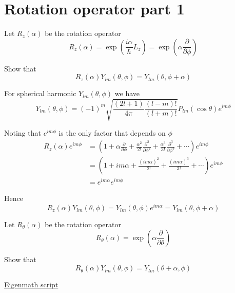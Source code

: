 

\section*{Rotation operator part 1}

Let $R_z(\alpha)$ be the rotation operator
\begin{equation*}
R_z(\alpha)=\exp\left(\frac{i\alpha}{\hbar}L_z\right)
=\exp\left(\alpha\frac{\partial}{\partial\phi}\right)
\end{equation*}

Show that
\begin{equation*}
R_z(\alpha)Y_{lm}(\theta,\phi)=Y_{lm}(\theta,\phi+\alpha)
\end{equation*}

For spherical harmonic $Y_{lm}(\theta,\phi)$ we have
\begin{equation*}
Y_{lm}(\theta,\phi)=(-1)^m\sqrt{\frac{(2l+1)}{4\pi}\frac{(l-m)!}{(l+m)!}}
P_{lm}(\cos\theta)e^{im\phi}
\end{equation*}

Noting that $e^{im\phi}$ is the only factor that depends on $\phi$
\begin{align*}
R_z(\alpha)e^{im\phi}
&=\left(1+\alpha\frac{\partial}{\partial\phi}
+\frac{\alpha^2}{2!}\frac{\partial^2}{\partial\phi^2}
+\frac{\alpha^3}{3!}\frac{\partial^3}{\partial\phi^3}
+\cdots\right)e^{im\phi}
\\
&=\left(1+im\alpha
+\frac{(im\alpha)^2}{2!}
+\frac{(im\alpha)^3}{3!}
+\cdots\right)e^{im\phi}
\\
&=e^{im\alpha}e^{im\phi}
\end{align*}

Hence
\begin{equation*}
R_z(\alpha)Y_{lm}(\theta,\phi)=Y_{lm}(\theta,\phi)e^{im\alpha}=Y_{lm}(\theta,\phi+\alpha)
\tag{1}
\end{equation*}

Let $R_\theta(\alpha)$ be the rotation operator
\begin{equation*}
R_\theta(\alpha)=\exp\left(\alpha\frac{\partial}{\partial\theta}\right)
\end{equation*}

Show that
\begin{equation*}
R_\theta(\alpha)Y_{lm}(\theta,\phi)=Y_{lm}(\theta+\alpha,\phi)
\tag{2}
\end{equation*}

\href{https://georgeweigt.github.io/examples/rotation-operator-part-1-demo.html}{Eigenmath script}



